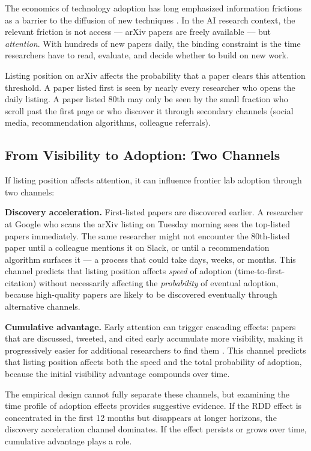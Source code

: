 \documentclass[12pt]{article}
\begin{document}
The economics of technology adoption has long emphasized information frictions as a barrier to the diffusion of new techniques \citep{jones2009}. In the AI research context, the relevant friction is not access --- arXiv papers are freely available --- but \textit{attention}. With hundreds of new papers daily, the binding constraint is the time researchers have to read, evaluate, and decide whether to build on new work.

Listing position on arXiv affects the probability that a paper clears this attention threshold. A paper listed first is seen by nearly every researcher who opens the daily listing. A paper listed 80th may only be seen by the small fraction who scroll past the first page or who discover it through secondary channels (social media, recommendation algorithms, colleague referrals).

\subsection{From Visibility to Adoption: Two Channels}

If listing position affects attention, it can influence frontier lab adoption through two channels:

\textbf{Discovery acceleration.} First-listed papers are discovered earlier. A researcher at Google who scans the arXiv listing on Tuesday morning sees the top-listed papers immediately. The same researcher might not encounter the 80th-listed paper until a colleague mentions it on Slack, or until a recommendation algorithm surfaces it --- a process that could take days, weeks, or months. This channel predicts that listing position affects \textit{speed} of adoption (time-to-first-citation) without necessarily affecting the \textit{probability} of eventual adoption, because high-quality papers are likely to be discovered eventually through alternative channels.

\textbf{Cumulative advantage.} Early attention can trigger cascading effects: papers that are discussed, tweeted, and cited early accumulate more visibility, making it progressively easier for additional researchers to find them \citep{merton1968, barabasi1999}. This channel predicts that listing position affects both the speed and the total probability of adoption, because the initial visibility advantage compounds over time.

The empirical design cannot fully separate these channels, but examining the time profile of adoption effects provides suggestive evidence. If the RDD effect is concentrated in the first 12 months but disappears at longer horizons, the discovery acceleration channel dominates. If the effect persists or grows over time, cumulative advantage plays a role.
\end{document}
